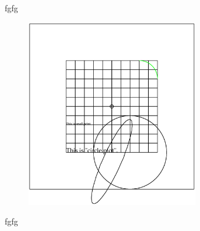 \documentclass[10pt,a4paper]{article}
\begin{document}
fgfg
\begin{figure}[hbt!]
  \centering
  \includegraphics[width=7.5cm]{circle}
\end{figure}

fgfg
\end{document}
